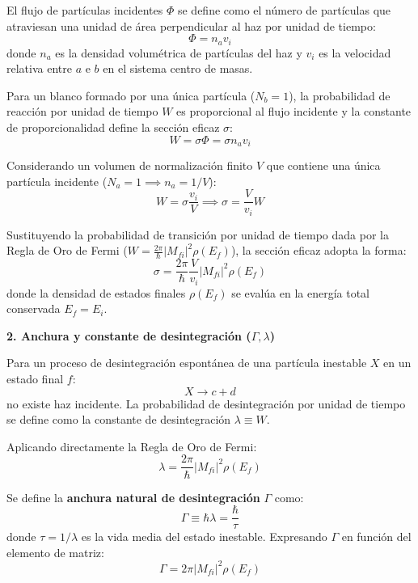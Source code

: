 El flujo de partículas incidentes $\Phi$ se define como el número de partículas que atraviesan una unidad de área perpendicular al haz por unidad de tiempo:
\begin{equation}
\Phi = n_a v_i
\end{equation}
donde $n_a$ es la densidad volumétrica de partículas del haz y $v_i$ es la velocidad relativa entre $a$ e $b$ en el sistema centro de masas.

Para un blanco formado por una única partícula ($N_b = 1$), la probabilidad de reacción por unidad de tiempo $W$ es proporcional al flujo incidente y la constante de proporcionalidad define la sección eficaz $\sigma$:
\begin{equation}
W = \sigma \Phi = \sigma n_a v_i
\end{equation}

Considerando un volumen de normalización finito $V$ que contiene una única partícula incidente ($N_a = 1 \implies n_a = 1/V$):
\begin{equation}
W = \sigma \frac{v_i}{V} \implies \sigma = \frac{V}{v_i} W
\end{equation}

Sustituyendo la probabilidad de transición por unidad de tiempo dada por la Regla de Oro de Fermi ($W = \frac{2\pi}{\hbar} |M_{fi}|^2 \rho(E_f)$), la sección eficaz adopta la forma:
\begin{equation}
\sigma = \frac{2\pi}{\hbar} \frac{V}{v_i} |M_{fi}|^2 \rho(E_f)
\end{equation}
donde la densidad de estados finales $\rho(E_f)$ se evalúa en la energía total conservada $E_f = E_i$.

\textbf{2. Anchura y constante de desintegración ($\Gamma, \lambda$)}

Para un proceso de desintegración espontánea de una partícula inestable $X$ en un estado final $f$:
\begin{equation}
X \longrightarrow c + d
\end{equation}
no existe haz incidente. La probabilidad de desintegración por unidad de tiempo se define como la constante de desintegración $\lambda \equiv W$.

Aplicando directamente la Regla de Oro de Fermi:
\begin{equation}
\lambda = \frac{2\pi}{\hbar} |M_{fi}|^2 \rho(E_f)
\end{equation}

Se define la \textbf{anchura natural de desintegración} $\Gamma$ como:
\begin{equation}
\Gamma \equiv \hbar \lambda = \frac{\hbar}{\tau}
\end{equation}
donde $\tau = 1/\lambda$ es la vida media del estado inestable. Expresando $\Gamma$ en función del elemento de matriz:
\begin{equation}
\Gamma = 2\pi |M_{fi}|^2 \rho(E_f)
\end{equation}


